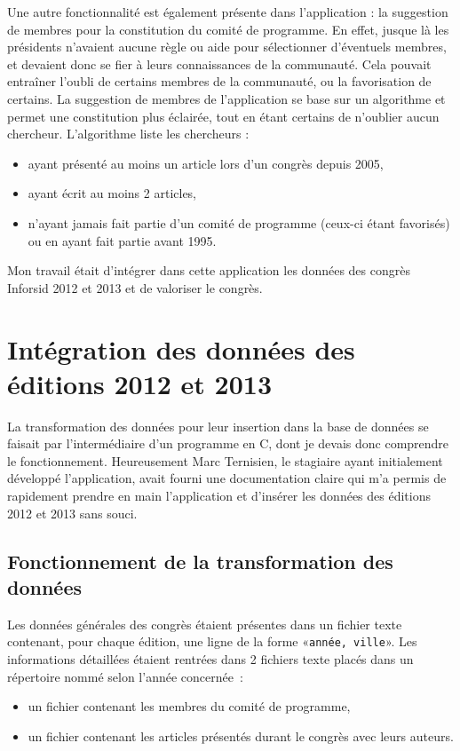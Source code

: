 		Une autre fonctionnalité est également présente dans l\rq{}application : la suggestion de membres pour la constitution du comité de programme. En effet, jusque là les présidents n\rq{}avaient aucune règle ou aide pour sélectionner d\rq{}éventuels membres, et devaient donc se fier à leurs connaissances de la communauté. Cela pouvait entraîner l\rq{}oubli de certains membres de la communauté, ou la favorisation de certains. La suggestion de membres de l\rq{}application se base sur un algorithme et permet une constitution plus éclairée, tout en étant certains de n\rq{}oublier aucun chercheur. L\rq{}algorithme liste les chercheurs :
		\begin{itemize}
			\item ayant présenté au moins un article lors d\rq{}un congrès depuis 2005, 
			\item ayant écrit au moins 2 articles,
			\item n\rq{}ayant jamais fait partie d\rq{}un comité de programme (ceux-ci étant favorisés) ou en ayant fait partie avant 1995.
		\end{itemize}
		
		Mon travail était d\rq{}intégrer dans cette application les données des congrès Inforsid 2012 et 2013 et de valoriser le congrès.
		

	\section{Intégration des données des éditions 2012 et 2013}
		La transformation des données pour leur insertion dans la base de données se faisait par l\rq{}intermédiaire d\rq{}un programme en C, dont je devais donc comprendre le fonctionnement. Heureusement Marc Ternisien, le stagiaire ayant initialement développé l\rq{}application, avait fourni une documentation claire qui m\rq{}a permis de rapidement prendre en main l\rq{}application et d'insérer les données des éditions 2012 et 2013 sans souci.
		
		
			\subsection{Fonctionnement de la transformation des données}
				Les données générales des congrès étaient présentes dans un fichier texte contenant, pour chaque édition, une ligne de la forme «\texttt{année, ville}».
				Les informations détaillées étaient rentrées dans 2 fichiers texte placés dans un répertoire nommé selon l'année concernée~:
				\begin{itemize}
					\item un fichier contenant les membres du comité de programme,
					\item un fichier contenant les articles présentés durant le congrès avec leurs auteurs.
				\end{itemize}
				
